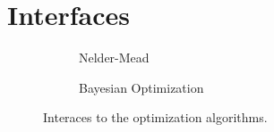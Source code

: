 \section{Interfaces}

\begin{figure}
  \centering
  \begin{subfigure}[b]{0.22\textwidth}
    \caption{Nelder-Mead}\label{fig:interface_nm}
  \end{subfigure}
  \quad
  \begin{subfigure}[b]{0.22\textwidth}
    \caption{Bayesian Optimization}\label{fig:interface_bo}
  \end{subfigure}
  \caption{Interaces to the optimization algorithms.}\label{fig:interfaces}
\end{figure}

